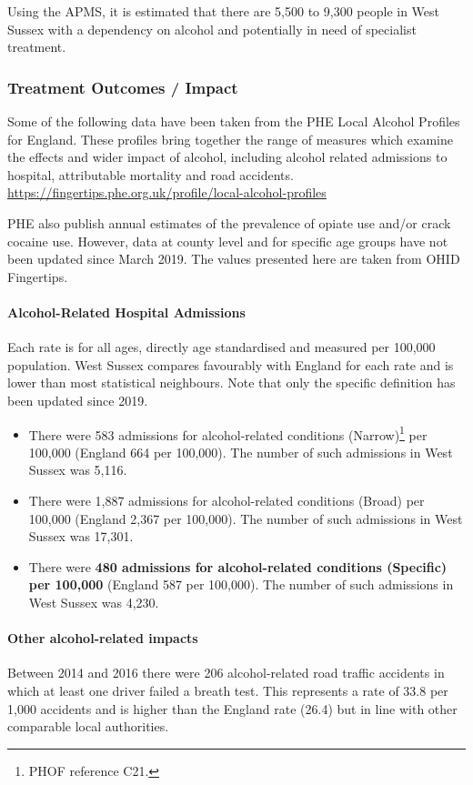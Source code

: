 Using the APMS, it is estimated that there are 5,500 to 9,300 people in West Sussex with a dependency on alcohol and potentially in need of specialist treatment.


\subsubsection{Treatment Outcomes / Impact}
Some of the following data have been taken from the PHE Local Alcohol Profiles for England. These profiles bring together the range of measures which examine the effects and wider impact of alcohol, including alcohol related admissions to hospital, attributable mortality and road accidents. \url{https://fingertips.phe.org.uk/profile/local-alcohol-profiles}

PHE also publish annual estimates of the prevalence of opiate use and/or crack cocaine use. However, data at county level and for specific age groups have not been updated since March 2019. The values presented here are taken from OHID Fingertips.

\paragraph{Alcohol-Related Hospital Admissions} Each rate is for all ages, directly age standardised and measured per 100,000 population. West Sussex compares favourably with England for each rate and is lower than most statistical neighbours. Note that only the specific definition has been updated since 2019.
\begin{itemize}[noitemsep]
    \item There were 583 admissions for alcohol-related conditions (Narrow)\footnote{PHOF reference C21.} per 100,000 (England 664 per 100,000). The number of such admissions in West Sussex was 5,116.
    \item There were 1,887 admissions for alcohol-related conditions (Broad) per 100,000 (England 2,367 per 100,000). The number of such admissions in West Sussex was 17,301.
    \item There were {\bfseries 480 admissions for alcohol-related conditions (Specific) per 100,000} (England 587 per 100,000). The number of such admissions in West Sussex was 4,230.
\end{itemize}
  
\paragraph{Other alcohol-related impacts}
Between 2014 and 2016 there were 206 alcohol-related road traffic accidents in which at least one driver failed a breath test. This represents a rate of 33.8 per 1,000 accidents and is higher than the England rate (26.4) but in line with other comparable local authorities.

